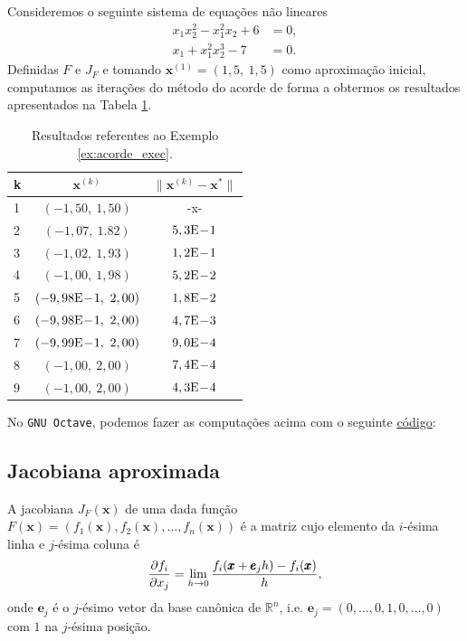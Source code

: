 \begin{ex}\label{ex:acorde_exec}
  Consideremos o seguinte sistema de equações não lineares
  \begin{align}
    x_1x_2^2 - x_1^2x_2 + 6 &= 0,\\
    x_1 + x_1^2x_2^3 - 7 &= 0.
  \end{align}
  Definidas $F$ e $J_F$ e tomando $\pmb{x}^{(1)} = (1,5,~1,5)$ como aproximação inicial, computamos as iterações do método do acorde de forma a obtermos os resultados apresentados na Tabela \ref{tab:ex_acorde_exec}.

  \begin{table}[h!]
    \centering
    \begin{tabular}{lcc}
      k & $\pmb{x}^{(k)}$ & $\|\pmb{x}^{(k)} - \pmb{x}^*\|$\\\hline
      1 & $(-1,50,~1,50)$ & -x- \\
      2 & $(-1,07,~1.82)$ & $5,3\mathrm{E}\!-\!1$ \\
      3 & $(-1,02,~1,93)$ & $1,2\mathrm{E}\!-\!1$ \\
      4 & $(-1,00,~1,98)$ & $5,2\mathrm{E}\!-\!2$ \\
      5 & $(-9,98\mathrm{E}\!-\!1,~2,00)$ & $1,8\mathrm{E}\!-\!2$ \\
      6 & $(-9,98\mathrm{E}\!-\!1,~2,00)$ & $4,7\mathrm{E}\!-\!3$ \\
      7 & $(-9,99\mathrm{E}\!-\!1,~2,00)$ & $9,0\mathrm{E}\!-\!4$ \\
      8 & $(-1,00,~2,00)$ & $7,4\mathrm{E}\!-\!4$ \\
      9 & $(-1,00,~2,00)$ & $4,3\mathrm{E}\!-\!4$ \\\hline
    \end{tabular}
    \caption{Resultados referentes ao Exemplo \ref{ex:acorde_exec}.}
    \label{tab:ex_acorde_exec}
  \end{table}

\ifisoctave
No \verb+GNU Octave+, podemos fazer as computações acima com o seguinte \href{https://github.com/phkonzen/notas/blob/master/src/MatematicaNumerica/cap_snl/dados/ex_acorde_exec/ex_acorde_exec.m}{código}:

\fi
\end{ex}

\subsection{Jacobiana aproximada}

A jacobiana $J_F(\pmb{x})$ de uma dada função $F(\pmb{x}) = (f_1(\pmb{x}), f_2(\pmb{x}), \dotsc, f_n(\pmb{x}))$ é a matriz cujo elemento da $i$-ésima linha e $j$-ésima coluna é
\begin{equation}
  \frac{\partial f_i}{\partial x_j} = \lim_{h\to 0} \frac{f_i(\pmb{x}+\pmb{e}_jh) - f_i(\pmb{x})}{h},
\end{equation}
onde $\pmb{e}_j$ é o $j$-ésimo vetor da base canônica de $\mathbb{R}^n$, i.e. $\pmb{e}_j = (0, \dotsc, 0, 1, 0, \dotsc, 0)$ com $1$ na $j$-ésima posição.

